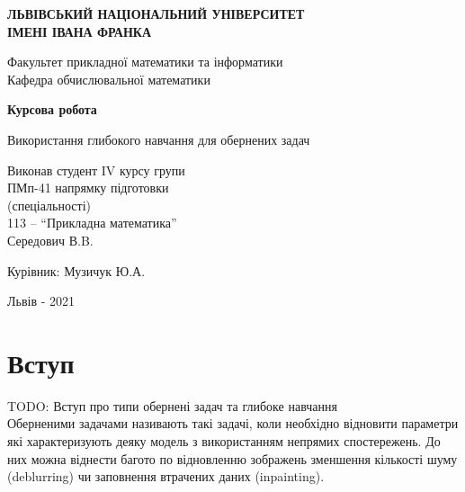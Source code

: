 \documentclass[14pt,a4paper]{extarticle}
\newcounter{e}
\newcounter{tabl}
\numberwithin{equation}{section}
\numberwithin{figure}{section}
\begin{document}
	\begin{titlepage}%
		\begin{center}
			{\textbf{ЛЬВІВСЬКИЙ НАЦІОНАЛЬНИЙ УНІВЕРСИТЕТ \\ ІМЕНІ ІВАНА ФРАНКА}}\par
			{Факультет прикладної математики та інформатики \\ Кафедра обчислювальної математики}\par
			\begin{center}
				
			\end{center}
			\vspace{25mm}
			{\textbf{\huge{Курсова робота}}}\par
			\vspace{5mm}
			{\large{Використання глибокого навчання для обернених задач}}\par
			\vspace{5mm}
			{}\par %
		\end{center}
		
		\vfill
		\vskip80pt
		
		\begin{flushleft}
			\hskip 8cm 
			Виконав студент IV курсу групи
			\\ \hskip8cm
			ПМп-41 напрямку підготовки 
			\\ \hskip8cm
			(спеціальності)
			\\ \hskip8cm
			113 -- ``Прикладна математика''
			\\ \hskip8cm
			Середович В.B.
		\end{flushleft}
		\begin{flushleft}
			\hskip8cm 
			Курівник: Музичук Ю.А.
		\end{flushleft}
		
		\vfill
		
		\begin{center}
			\large
			Львів - 2021
		\end{center}
	\end{titlepage}

	\tableofcontents

	
	\newpage
	\thispagestyle{empty}
	\section*{Вступ}
	TODO: Вступ про типи обернені задач та глибоке навчання
	\\
	Оберненими задачами називають такі задачі, коли необхідно відновити параметри які характеризують деяку модель з використанням непрямих спостережень. До них можна віднести багото по відновленню зображень зменшення кількості шуму (deblurring) чи заповнення втрачених даних (inpainting).
\end{document}

